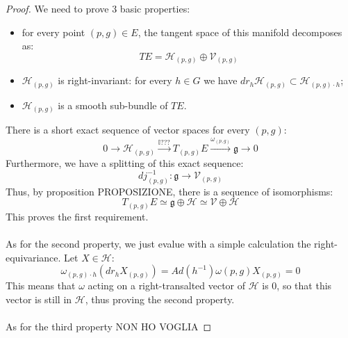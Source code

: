 \documentclass[12pt,a4paper]{report}
\theoremstyle{definition}
\theoremstyle{Theorem}
\theoremstyle{definition}
\theoremstyle{definition}
\begin{document}
		\begin{proof}
			We need to prove 3 basic properties:
			\begin{itemize}
				\item for every point $(p,g)\in E$, the tangent space of this manifold decomposes as:
				$$TE=\mathcal{H}_{(p,g)}\oplus \mathcal{V}_{(p,g)}$$
				\item $\mathcal{H}_{(p,g)}$ is right-invariant: for every $h\in G$ we have $dr_h \mathcal{H}_{(p,g)}\subset \mathcal{H}_{(p,g)\cdot h}$;
				\item $\mathcal{H}_{(p,g)}$ is a smooth sub-bundle of $TE$.
			\end{itemize}
			There is a short exact sequence of vector spaces for every $(p,g)$:
			$$0\rightarrow \mathcal{H}_{(p,g)}\xrightarrow{\mathbb{I}???} T_{(p,g)}E\xrightarrow{\omega_{(p,g)}} \mathfrak{g}\rightarrow0$$
			Furthermore, we have a splitting of this exact sequence: 
			$$dj_{(p,g)}^{-1}:\mathfrak{g}\rightarrow \mathcal{V}_{(p,g)}$$
			Thus, by proposition PROPOSIZIONE, there is a sequence of isomorphisms:
			$$T_{(p,g)}E\simeq\mathfrak{g}\oplus\mathcal{H}\simeq\mathcal{V}\oplus\mathcal{H}$$
			This proves the first requirement.\\
			\\
			As for the second property, we just evalue with a simple calculation the right-equivariance. Let $X\in\mathcal{H}$:
			$$\omega_{(p,g)\cdot h}(dr_hX_{(p,g)})=Ad(h^{-1})\omega{(p,g)}X_{(p,g)}=0$$
			This means that $\omega$ acting on a right-transalted vector of $\mathcal{H}$ is 0, so that this vector is still in $\mathcal{H}$, thus proving the second property.\\
			\\
			As for the third property NON HO VOGLIA
		\end{proof}
\end{document}
